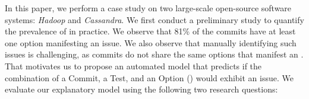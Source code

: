 

In this paper, we perform a case study on two large-scale open-source software systems: \emph{Hadoop} and \emph{Cassandra}. We first conduct a preliminary study to quantify the prevalence of \inconsistent in practice. We observe that 81\% of the commits have at least one option manifesting an \inconsistent issue. We also observe that manually identifying such issues is challenging, as commits do not share the same options that manifest an \inconsistent. That motivates us to propose an automated model that predicts if the combination of a Commit, a Test, and an Option (\textbf{\instance}) would exhibit an \inconsistent issue. We evaluate our explanatory model using the following two research questions: 


